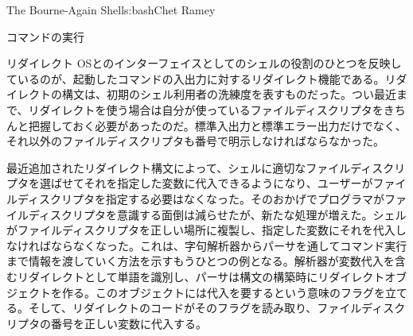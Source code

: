 \begin{aosachapter}{The Bourne-Again Shell}{s:bash}{Chet Ramey}
\begin{aosasect1}{コマンドの実行}
\begin{aosasect2}{リダイレクト}
OSとのインターフェイスとしてのシェルの役割のひとつを反映しているのが、起動したコマンドの入出力に対するリダイレクト機能である。リダイレクトの構文は、初期のシェル利用者の洗練度を表すものだった。つい最近まで、リダイレクトを使う場合は自分が使っているファイルディスクリプタをきちんと把握しておく必要があったのだ。標準入出力と標準エラー出力だけでなく、それ以外のファイルディスクリプタも番号で明示しなければならなかった。

最近追加されたリダイレクト構文によって、シェルに適切なファイルディスクリプタを選ばせてそれを指定した変数に代入できるようになり、ユーザーがファイルディスクリプタを指定する必要はなくなった。そのおかげでプログラマがファイルディスクリプタを意識する面倒は減らせたが、新たな処理が増えた。シェルがファイルディスクリプタを正しい場所に複製し、指定した変数にそれを代入しなければならなくなった。これは、字句解析器からパーサを通してコマンド実行まで情報を渡していく方法を示すもうひとつの例となる。解析器が変数代入を含むリダイレクトとして単語を識別し、パーサは構文の構築時にリダイレクトオブジェクトを作る。このオブジェクトには代入を要するという意味のフラグを立てる。そして、リダイレクトのコードがそのフラグを読み取り、ファイルディスクリプタの番号を正しい変数に代入する。


\end{aosasect2}
\end{aosasect1}
\end{aosachapter}
